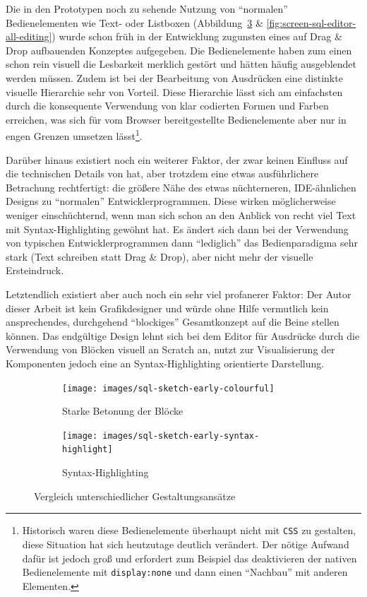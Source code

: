 Die in den Prototypen noch zu sehende Nutzung von "`normalen"' Bedienelementen wie Text- oder Listboxen (Abbildung~\ref{fig:compare-colourful} \& \ref{fig:screen-sql-editor-all-editing}) wurde schon früh in der Entwicklung zugunsten eines auf Drag \& Drop aufbauenden Konzeptes aufgegeben. Die Bedienelemente haben zum einen schon rein visuell die Lesbarkeit merklich gestört und hätten häufig ausgeblendet werden müssen. Zudem ist bei der Bearbeitung von Ausdrücken eine distinkte visuelle Hierarchie sehr von Vorteil. Diese Hierarchie lässt sich am einfachsten durch die konsequente Verwendung von klar codierten Formen und Farben erreichen, was sich für vom Browser bereitgestellte Bedienelemente aber nur in engen Grenzen umsetzen lässt\footnote{Historisch waren diese Bedienelemente überhaupt nicht mit \texttt{CSS} zu gestalten, diese Situation hat sich heutzutage deutlich verändert. Der nötige Aufwand dafür ist jedoch groß und erfordert zum Beispiel das deaktivieren der nativen Bedienelemente mit \texttt{display:none} und dann einen "`Nachbau"' mit anderen Elementen.}.

Darüber hinaus existiert noch ein weiterer Faktor, der zwar keinen Einfluss auf die technischen Details von \idename{} hat, aber trotzdem eine etwas ausführlichere Betrachung rechtfertigt: die größere Nähe des etwas nüchterneren, IDE-ähnlichen Designs zu "`normalen"' Entwicklerprogrammen. Diese wirken möglicherweise weniger einschüchternd, wenn man sich schon an den Anblick von recht viel Text mit Syntax-Highlighting gewöhnt hat. Es ändert sich dann bei der Verwendung von typischen Entwicklerprogrammen dann "`lediglich"' das Bedienparadigma sehr stark (Text schreiben statt Drag \& Drop), aber nicht mehr der visuelle Ersteindruck.

Letztendlich existiert aber auch noch ein sehr viel profanerer Faktor: Der Autor dieser Arbeit ist kein Grafikdesigner und würde ohne Hilfe vermutlich kein ansprechendes, durchgehend "`blockiges"' Gesamtkonzept auf die Beine stellen können. Das endgültige Design lehnt sich bei dem Editor für Ausdrücke durch die Verwendung von Blöcken visuell an Scratch an, nutzt zur Visualisierung der Komponenten jedoch eine an Syntax-Highlighting orientierte Darstellung.

\begin{figure}[h]
  \begin{subfigure}[b]{0.45\textwidth}
    \texttt{[image: images/sql-sketch-early-colourful]}
    \caption{Starke Betonung der Blöcke}
    \label{fig:screen-sql-editor-early-colourful}
  \end{subfigure}\hfill
  \begin{subfigure}[b]{0.45\textwidth}
    \texttt{[image: images/sql-sketch-early-syntax-highlight]}
    \caption{Syntax-Highlighting}
    \label{fig:screen-sql-editor-early-syntax-highlighting}
  \end{subfigure}
  \caption{Vergleich unterschiedlicher Gestaltungsansätze}
  \label{fig:compare-colourful}
\end{figure}

